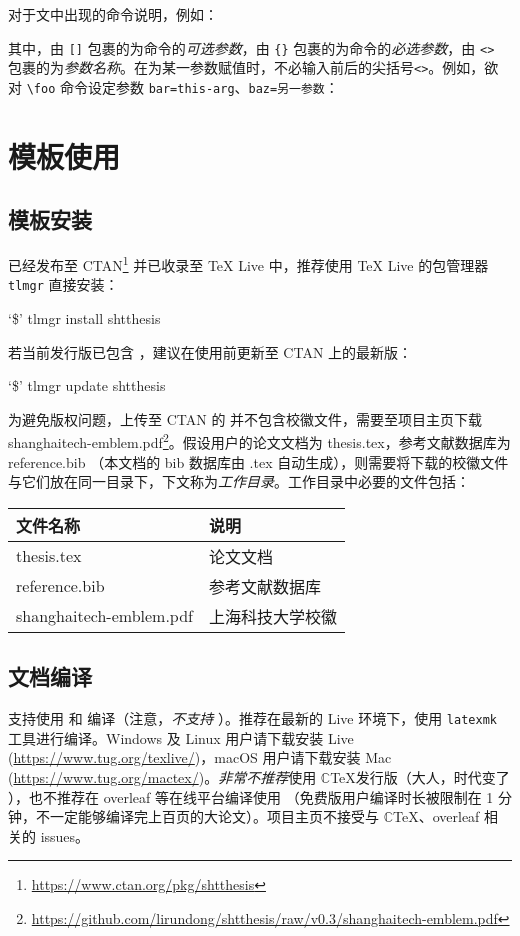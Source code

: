 \documentclass[doctor]{shtthesis}
\newcommand\prompt{\textup{\$}}
\providecommand{\emoji}[1]{ \fbox{\emph{#1}} }
\begin{document}
对于文中出现的命令说明，例如：
\begin{latex}
\end{latex}
其中，由 \verb|[]| 包裹的为命令的\emph{可选参数}，由 \verb|{}| 包裹的为命令的\emph{必选参数}，由 \verb|<>| 包裹的为\emph{参数名称}。在为某一参数赋值时，不必输入前后的尖括号\verb|<>|。例如，欲对 \verb|\foo| 命令设定参数 \verb|bar=this-arg|、\verb|baz=另一参数|：
\begin{latex}
\end{latex}

\chapter{模板使用}
\section{模板安装}
\shtthesis{} 已经发布至 CTAN\footnote{\url{https://www.ctan.org/pkg/shtthesis}} 并已收录至 \TeX{} Live 中，推荐使用 \TeX{} Live 的包管理器 \verb|tlmgr| 直接安装：
\begin{shell}
`\prompt' tlmgr install shtthesis
\end{shell}
若当前发行版已包含 \shtthesis{}，建议在使用前更新至 CTAN 上的最新版：
\begin{shell}
`\prompt' tlmgr update shtthesis
\end{shell}

为避免版权问题，上传至 CTAN 的 \shtthesis{} 并不包含校徽文件，需要至项目主页下载 shanghaitech-emblem.pdf\footnote{\url{https://github.com/lirundong/shtthesis/raw/v0.3/shanghaitech-emblem.pdf}}。假设用户的论文文档为 thesis.tex，参考文献数据库为 reference.bib （本文档的 bib 数据库由 \jobname.tex 自动生成），则需要将下载的校徽文件与它们放在同一目录下，下文称为\emph{工作目录}。工作目录中必要的文件包括：
\begin{center}
  \begin{tabular}{ll}
    \toprule
    文件名称 & 说明 \\
    \midrule 
    thesis.tex & 论文文档 \\
    reference.bib & 参考文献数据库 \\
    shanghaitech-emblem.pdf & 上海科技大学校徽 \\
    \bottomrule
  \end{tabular}
\end{center}

\section{文档编译}
\shtthesis{} 支持使用  和  编译（注意，\emph{不支持} ）。推荐在最新的  Live 环境下，使用 \verb|latexmk| 工具进行编译。Windows 及 Linux 用户请下载安装  Live (\url{https://www.tug.org/texlive/})，macOS 用户请下载安装 Mac (\url{https://www.tug.org/mactex/})。\emph{非常不推荐}使用 $\mathbb{C}$\TeX 发行版（大人，时代变了\emoji{unamused}），也不推荐在 overleaf 等在线平台编译使用 \shtthesis{} （免费版用户编译时长被限制在 1 分钟，不一定能够编译完上百页的大论文）。项目主页不接受与 $\mathbb{C}$\TeX、overleaf 相关的 issues。
\end{document}
